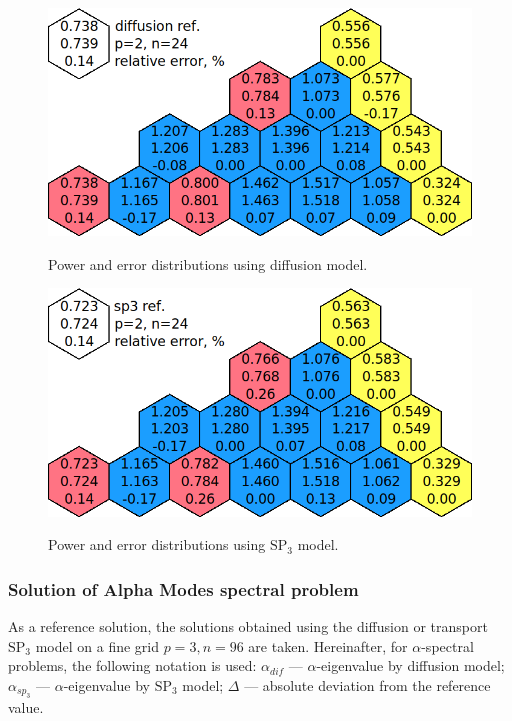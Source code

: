 \documentclass[authoryear]{elsarticle}
\begin{document}
\begin{figure}[H]
\begin{center}
	\includegraphics[width=0.75\linewidth]{diff_without_p2n24.png}\\
	\caption{Power and error distributions using diffusion model.}
	\label{fig:power_iaea_without_dif}
\end{center}
\end{figure}
\begin{figure}[H]
\begin{center}
	\includegraphics[width=0.75\linewidth]{sp3_without_p2n24.png}\\
	\caption{Power and error distributions using $\mathrm{SP_3}$ model.}
	\label{fig:power_ieae_without_sp3}
\end{center}
\end{figure}

\subsubsection{Solution of Alpha Modes spectral problem}
As a reference solution, the solutions obtained using the diffusion or transport $\mathrm{SP_3}$ model on a fine grid $ p = 3, n = 96 $ are taken.
Hereinafter, for $\alpha$-spectral problems, the following notation is used: $\alpha_{dif}$ --- $\alpha$-eigenvalue by diffusion model; $\alpha_{sp_3}$ --- $\alpha$-eigenvalue by $\mathrm{SP_3}$ model; $\Delta$ --- absolute deviation from the reference value.
\end{document}
